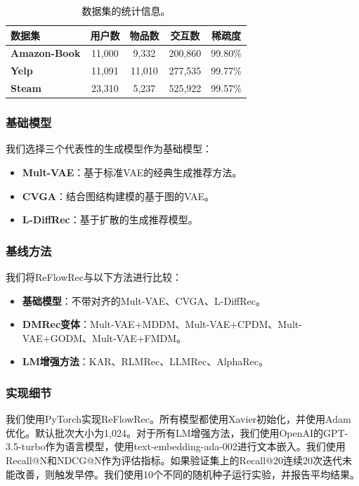 \documentclass[sigconf]{acmart}
\begin{document}
\begin{table}[t]
\small
\setlength{\abovecaptionskip}{0.1cm}
\setlength{\belowcaptionskip}{0.1cm} 
  \caption{数据集的统计信息。}
  \label{dataset}
  \begin{tabular}{l|c|c|c|c}
    \hline
    \textbf{数据集}&\textbf{用户数}&\textbf{物品数}&\textbf{交互数}&\textbf{稀疏度}\\
    \hline
    \hline
    \textbf{Amazon-Book}&11,000&9,332&200,860&99.80\%\\
    \textbf{Yelp}&11,091&11,010&277,535&99.77\%\\
    \textbf{Steam}&23,310&5,237&525,922&99.57\%\\
    \hline
  \end{tabular}
\end{table}

\subsubsection{\textbf{基础模型}}
我们选择三个代表性的生成模型作为基础模型：
\begin{itemize}[leftmargin=*]
    \item \textbf{Mult-VAE}\cite{liang2018variational}：基于标准VAE的经典生成推荐方法。
    \item \textbf{CVGA}\cite{zhang2023revisiting}：结合图结构建模的基于图的VAE。
    \item \textbf{L-DiffRec}\cite{wang2023diffusion}：基于扩散的生成推荐模型。
\end{itemize}

\subsubsection{\textbf{基线方法}}
我们将\textsf{ReFlowRec}与以下方法进行比较：
\begin{itemize}[leftmargin=*]
    \item \textbf{基础模型}：不带对齐的Mult-VAE、CVGA、L-DiffRec。
    \item \textbf{DMRec变体}：Mult-VAE+MDDM、Mult-VAE+CPDM、Mult-VAE+GODM、Mult-VAE+FMDM\cite{zhang2024dmrec}。
    \item \textbf{LM增强方法}：KAR\cite{xi2024towards}、RLMRec\cite{ren2024representation}、LLMRec\cite{wei2024llmrec}、AlphaRec\cite{sheng2024language}。
\end{itemize}

\subsubsection{\textbf{实现细节}} 
我们使用PyTorch实现\textsf{ReFlowRec}。所有模型都使用Xavier初始化，并使用Adam优化。默认批次大小为1,024。对于所有LM增强方法，我们使用OpenAI的GPT-3.5-turbo作为语言模型，使用text-embedding-ada-002进行文本嵌入。我们使用Recall@N和NDCG@N作为评估指标。如果验证集上的Recall@20连续20次迭代未能改善，则触发早停。我们使用10个不同的随机种子运行实验，并报告平均结果。
\end{document}
